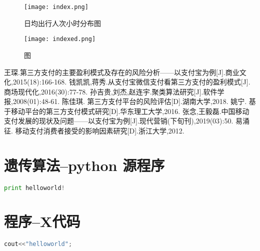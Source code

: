 \documentclass[withoutpreface,bwprint]{cumcmthesis} %
\begin{document}
\begin{figure}[htbp]
\centering
\texttt{[image: index.png]}
\caption{日均出行人次小时分布图}
\end{figure}

\begin{figure}[htbp]
\centering
\texttt{[image: indexed.png]}
\caption{图}
\end{figure}
\begin{thebibliography}{9}%
  王琛.第三方支付的主要盈利模式及存在的风险分析——以支付宝为例[J].商业文化,2015(18):166-168.
 钱凯凯,蒋秀.从支付宝微信支付看第三方支付的盈利模式[J].商场现代化,2016(30):77-78.
 孙吉贵,刘杰,赵连宇.聚类算法研究[J].软件学报,2008(01):48-61.
 陈佳琪. 第三方支付平台的风险评估[D].湖南大学,2018.
 姚宁. 基于移动平台的第三方支付模式研究[D].华东理工大学,2016.
 张念,王毅磊.中国移动支付发展的现状及问题——以支付宝为例[J].现代营销(下旬刊),2019(03):50.
 易涌征. 移动支付消费者接受的影响因素研究[D].浙江大学,2012.
 
\end{thebibliography}

\newpage
\begin{appendices}
\section{遗传算法--python 源程序}
\begin{lstlisting}[language=python]
print helloworld!
 \end{lstlisting}
 \section{程序--X代码}
\begin{lstlisting}[language=c]
cout<<"helloworld";
 \end{lstlisting}
\end{appendices}
\end{document}
